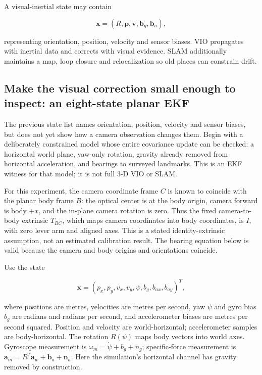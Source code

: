 A visual-inertial state may contain

\[
\mathbf{x}=(R,\mathbf{p},\mathbf{v},\mathbf{b}_g,\mathbf{b}_a),
\]

representing orientation, position, velocity and sensor biases. VIO propagates with inertial data and corrects with visual evidence. SLAM additionally maintains a map, loop closure and relocalization so old places can constrain drift.

\subsection{Make the visual correction small enough to inspect: an eight-state planar EKF}\label{04-visual-computing-ii-ch035-make-the-visual-correction-small-enough-to-inspect-an-eight-state-planar-ekf}

The previous state list names orientation, position, velocity and sensor biases, but does not yet show how a camera observation changes them. Begin with a deliberately constrained model whose entire covariance update can be checked: a horizontal world plane, yaw-only rotation, gravity already removed from horizontal acceleration, and bearings to surveyed landmarks. This is an EKF witness for that model; it is not full 3-D VIO or SLAM.

For this experiment, the camera coordinate frame \(C\) is known to coincide with the planar body frame \(B\): the optical center is at the body origin, camera forward is body \(+x\), and the in-plane camera rotation is zero. Thus the fixed camera-to-body extrinsic \(T_{BC}\), which maps camera coordinates into body coordinates, is \(I\), with zero lever arm and aligned axes. This is a stated identity-extrinsic assumption, not an estimated calibration result. The bearing equation below is valid because the camera and body origins and orientations coincide.

Use the state

\[
\mathbf{x}=(p_x,p_y,v_x,v_y,\psi,b_g,b_{ax},b_{ay})^T,
\]

where positions are metres, velocities are metres per second, yaw \(\psi\) and gyro bias \(b_g\) are radians and radians per second, and accelerometer biases are metres per second squared. Position and velocity are world-horizontal; accelerometer samples are body-horizontal. The rotation \(R(\psi)\) maps body vectors into world axes. Gyroscope measurement is \(\omega_m=\dot\psi+b_g+n_g\); specific-force measurement is \(\mathbf{a}_m=R^T\mathbf{a}_w+\mathbf{b}_a+\mathbf{n}_a\). Here the simulation's horizontal channel has gravity removed by construction.

